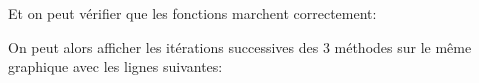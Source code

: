 {\begin{td-sol}
\begin{enumerate}
            Et on peut vérifier que les fonctions marchent correctement:
            
            \vspace{5pt}
            \begin{minipage}{\textwidth}
                \centering
            \end{minipage}
            \vspace{5pt}
            
            On peut alors afficher les itérations successives des 3 méthodes sur le même graphique
            avec les lignes suivantes:
            
            \vspace{5pt}
            \begin{minipage}{0.48\textwidth}
                \centering
            \end{minipage}
            \begin{minipage}{0.48\textwidth}
                \centering
            \end{minipage}
            \vspace{5pt}


\end{enumerate}
\end{td-sol}}
